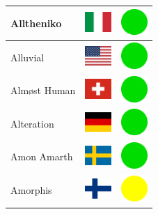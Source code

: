 \documentclass[12pt, a4paper, twoside]{report}
\begin{document}
\begin{center}
\begin{longtable}{|p{5cm}|p{2cm}|p{2cm}|}
 Alltheniko                                                 & \includegraphics[width=1cm]{../img/flags/it} &   \includegraphics[width=1cm]{../likes/y} \\ \hline
 Alluvial                                                   & \includegraphics[width=1cm]{../img/flags/us} &   \includegraphics[width=1cm]{../likes/y} \\ \hline
 Almøst Human                                               & \includegraphics[width=1cm]{../img/flags/ch} &   \includegraphics[width=1cm]{../likes/y} \\ \hline
 Alteration                                                 & \includegraphics[width=1cm]{../img/flags/de} &   \includegraphics[width=1cm]{../likes/y} \\ \hline
 Amon Amarth                                                & \includegraphics[width=1cm]{../img/flags/se} &   \includegraphics[width=1cm]{../likes/y} \\ \hline
 Amorphis                                                   & \includegraphics[width=1cm]{../img/flags/fi} &   \includegraphics[width=1cm]{../likes/m} \\ \hline

\end{longtable}
\end{center}
\end{document}
